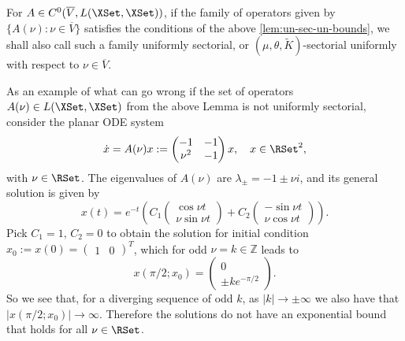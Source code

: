 \documentclass[a4paper]{siamart190516}
\begin{document}
 \begin{definition}
 For $A \in C^0(\overline{V},L(\XSet,\XSet))$, if the family of operators given by
 $\{ A(\nu): \nu \in \overline{V} \}$ satisfies the conditions of the above \cref{lem:un-sec-un-bounds}, we shall also call such a family uniformly sectorial, or $(\mu, \theta, \tilde{K})$-sectorial uniformly with respect to $\nu \in \overline{V}$. 
 \end{definition}
 
 \begin{remark}
 As an example of what can go wrong if the set of operators $A(\nu) \in L(\XSet,\XSet)$ from the above Lemma is not uniformly sectorial, consider the planar ODE system
 \begin{equation}
 \begin{aligned}
 \dot{x} = A(\nu) x := \begin{pmatrix} -1 & -1 \\ \nu^2 & -1 \end{pmatrix} x, \quad x \in \RSet^2,
 \end{aligned}
 \end{equation}
 with $\nu \in \RSet$. The eigenvalues of $A(\nu)$ are $\lambda_{\pm} = -1 \pm \nu i$, and its general solution is given by
 \[
 x(t) = e^{-t} \left( C_1 \begin{pmatrix} \cos \nu t \\ \nu \sin \nu t \end{pmatrix} +  C_2 \begin{pmatrix} -\sin \nu t \\ \nu \cos \nu t \end{pmatrix}    \right).
 \]
 Pick $C_1 = 1, \, C_2=0$ to obtain the solution for initial condition $x_0 := x(0) = \begin{pmatrix} 1 & 0 \end{pmatrix}^T$, which for odd $\nu = k \in \mathbb{Z}$ leads to
 \[
 x(\pi/2; x_0) =  \begin{pmatrix} 0 \\ \pm k e^{-\pi/2}  \end{pmatrix}.
 \]
 So we see that, for a diverging sequence of odd $k$, as $|k| \rightarrow \pm \infty$ we also have that $| x(\pi/2; x_0) | \rightarrow \infty$. Therefore the solutions do not have an exponential bound that holds for all $\nu \in \RSet$.
 \end{remark}
 
\end{document}

